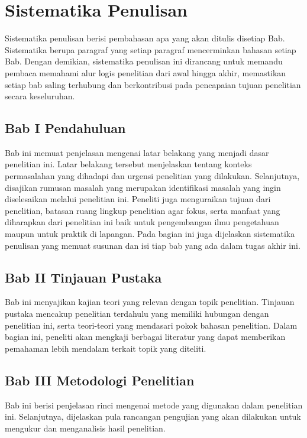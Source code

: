 \section{Sistematika Penulisan} \label{I.Sistematika}
Sistematika penulisan berisi pembahasan apa yang akan ditulis disetiap Bab. Sistematika  berupa paragraf yang setiap paragraf mencerminkan bahasan setiap Bab. Dengan demikian, sistematika penulisan ini dirancang untuk memandu pembaca memahami alur logis penelitian dari awal hingga akhir, memastikan setiap bab saling terhubung dan berkontribusi pada pencapaian tujuan penelitian secara keseluruhan. \par
\subsection{Bab I Pendahuluan}
Bab ini memuat penjelasan mengenai latar belakang yang menjadi dasar penelitian ini. Latar belakang tersebut menjelaskan tentang konteks permasalahan yang dihadapi dan urgensi penelitian yang dilakukan. Selanjutnya, disajikan rumusan masalah yang merupakan identifikasi masalah yang ingin diselesaikan melalui penelitian ini. Peneliti juga menguraikan tujuan dari penelitian, batasan ruang lingkup penelitian agar fokus, serta manfaat yang diharapkan dari penelitian ini baik untuk pengembangan ilmu pengetahuan maupun untuk praktik di lapangan. Pada bagian ini juga dijelaskan sistematika penulisan yang memuat susunan dan isi tiap bab yang ada dalam tugas akhir ini.

\subsection{Bab II Tinjauan Pustaka}
Bab ini menyajikan kajian teori yang relevan dengan topik penelitian. Tinjauan pustaka mencakup penelitian terdahulu yang memiliki hubungan dengan penelitian ini, serta teori-teori yang mendasari pokok bahasan penelitian. Dalam bagian ini, peneliti akan mengkaji berbagai literatur yang dapat memberikan pemahaman lebih mendalam terkait topik yang diteliti.

\subsection{Bab III Metodologi Penelitian}
Bab ini berisi penjelasan rinci mengenai metode yang digunakan dalam penelitian ini. Selanjutnya, dijelaskan pula rancangan pengujian yang akan dilakukan untuk mengukur dan menganalisis hasil penelitian.

